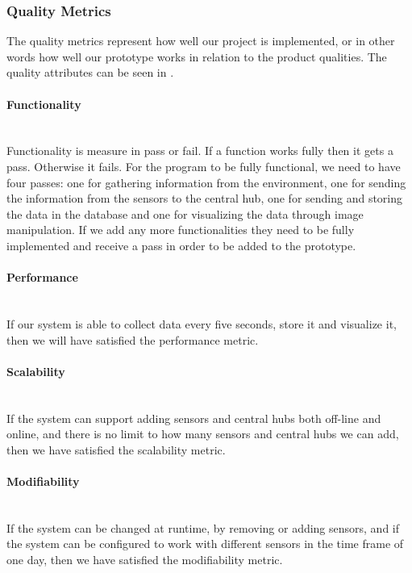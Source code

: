 \documentclass[../document.tex]{subfiles}
\begin{document}
\subsubsection{Quality Metrics}
\label{subsubsec:quality_metrics}
The quality metrics represent how well our project is implemented, or in other words how well our prototype works in relation to the product qualities. The quality attributes can be seen in .

\paragraph{Functionality} \ \\
Functionality is measure in pass or fail. If a function works fully then it gets a pass. Otherwise it fails. For the program to be fully functional, we need to have four passes: one for gathering information from the environment, one for sending the information from the sensors to the central hub, one for sending and storing the data in the database and one for visualizing the data through image manipulation. If we add any more functionalities they need to be fully implemented and receive a pass in order to be added to the prototype.

\paragraph{Performance} \ \\
If our system is able to collect data every five seconds, store it and visualize it, then we will have satisfied the performance metric.

\paragraph{Scalability} \ \\
If the system can support adding sensors and central hubs both off-line and online, and there is no limit to how many sensors and central hubs we can add, then we have satisfied the scalability metric.

\paragraph{Modifiability} \ \\
If the system can be changed at runtime, by removing or adding sensors, and if the system can be configured to work with different sensors in the time frame of one day, then we have satisfied the modifiability metric.
\end{document}
